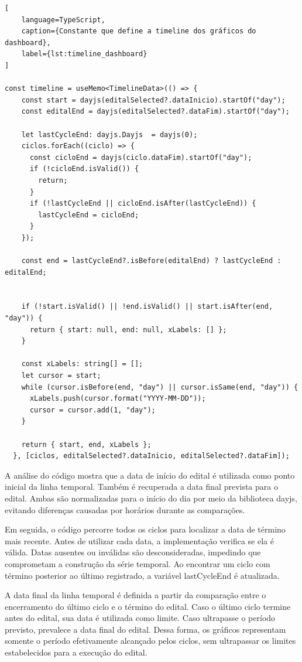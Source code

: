\begin{lstlisting}[
    language=TypeScript,
    caption={Constante que define a timeline dos gráficos do dashboard},
    label={lst:timeline_dashboard}
]

const timeline = useMemo<TimelineData>(() => {
    const start = dayjs(editalSelected?.dataInicio).startOf("day");
    const editalEnd = dayjs(editalSelected?.dataFim).startOf("day");

    let lastCycleEnd: dayjs.Dayjs  = dayjs(0);
    ciclos.forEach((ciclo) => {
      const cicloEnd = dayjs(ciclo.dataFim).startOf("day");
      if (!cicloEnd.isValid()) {
        return;
      }
      if (!lastCycleEnd || cicloEnd.isAfter(lastCycleEnd)) {
        lastCycleEnd = cicloEnd;
      }
    });

    const end = lastCycleEnd?.isBefore(editalEnd) ? lastCycleEnd : editalEnd;


    if (!start.isValid() || !end.isValid() || start.isAfter(end, "day")) {
      return { start: null, end: null, xLabels: [] };
    }

    const xLabels: string[] = [];
    let cursor = start;
    while (cursor.isBefore(end, "day") || cursor.isSame(end, "day")) {
      xLabels.push(cursor.format("YYYY-MM-DD"));
      cursor = cursor.add(1, "day");
    }

    return { start, end, xLabels };
  }, [ciclos, editalSelected?.dataInicio, editalSelected?.dataFim]);
\end{lstlisting}

A análise do código mostra que a data de início do edital é utilizada como ponto inicial da linha temporal. Também é recuperada a data final prevista para o edital. Ambas são normalizadas para o início do dia por meio da biblioteca dayjs, evitando diferenças causadas por horários durante as comparações.

Em seguida, o código percorre todos os ciclos para localizar a data de término mais recente. Antes de utilizar cada data, a implementação verifica se ela é válida. Datas ausentes ou inválidas são desconsideradas, impedindo que comprometam a construção da série temporal. Ao encontrar um ciclo com término posterior ao último registrado, a variável lastCycleEnd é atualizada.

A data final da linha temporal é definida a partir da comparação entre o encerramento do último ciclo e o término do edital. Caso o último ciclo termine antes do edital, sua data é utilizada como limite. Caso ultrapasse o período previsto, prevalece a data final do edital. Dessa forma, os gráficos representam somente o período efetivamente alcançado pelos ciclos, sem ultrapassar os limites estabelecidos para a execução do edital.

